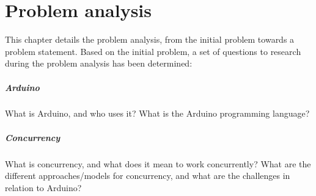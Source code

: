 \chapter{Problem analysis}\label{cha:problemanalysis}
This chapter details the problem analysis, from the initial problem towards a problem statement. Based on the initial problem, a set of questions to research during the problem analysis has been determined:

\paragraph{Arduino} What is Arduino, and who uses it? What is the Arduino programming language?
\paragraph{Concurrency} What is concurrency, and what does it mean to work concurrently? What are the different approaches/models for concurrency, and what are the challenges in relation to Arduino?













